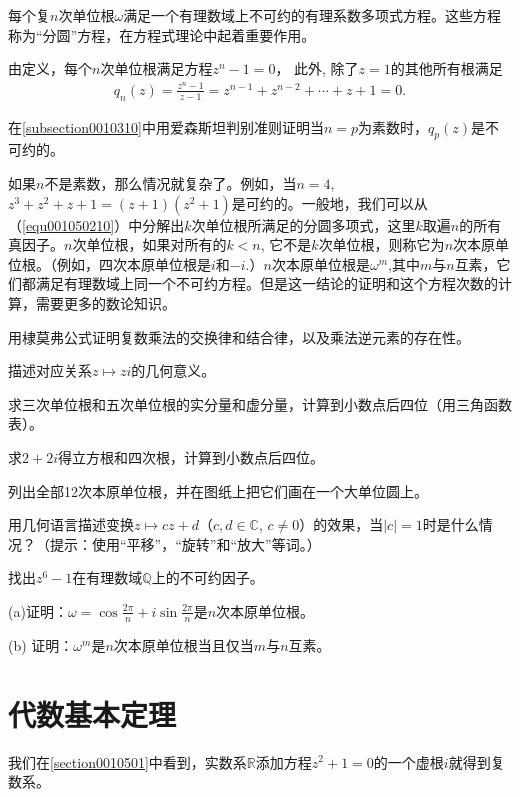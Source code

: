 每个复$n$次单位根$\omega$满足一个有理数域上不可约的有理系数多项式方程。这些方程称为“分圆”方程，在方程式理论中起着重要作用。

由定义，每个$n$次单位根满足方程$z^n-1=0$， 此外, 除了$z=1$的其他所有根满足
\begin{gather}\label{equ001050210}
q_n(z) = \frac{z^n-1}{z-1} = z^{n-1} + z^{n-2} + \cdots + z + 1 = 0.
\end{gather}

在\ref{subsection0010310}中用爱森斯坦判别准则证明当$n=p$为素数时，$q_p(z)$是不可约的。

如果$n$不是素数，那么情况就复杂了。例如，当$n=4$, $z^3+z^2+z+1=(z+1)(z^2+1)$是可约的。一般地，我们可以从（\ref{equ001050210}）中分解出$k$次单位根所满足的分圆多项式，这里$k$取遍$n$的所有真因子。$n$次单位根，如果对所有的$k<n$, 它不是$k$次单位根，则称它为$n$次本原单位根。（例如，四次本原单位根是$i$和$-i$.）$n$次本原单位根是$\omega^m$,其中$m$与$n$互素，它们都满足有理数域上同一个不可约方程。但是这一结论的证明和这个方程次数的计算，需要更多的数论知识。

\begin{problemset}
\item 用棣莫弗公式证明复数乘法的交换律和结合律，以及乘法逆元素的存在性。

\item 描述对应关系$z \mapsto zi$的几何意义。

\item 求三次单位根和五次单位根的实分量和虚分量，计算到小数点后四位（用三角函数表）。

\item 求$2+2i$得立方根和四次根，计算到小数点后四位。

\item 列出全部12次本原单位根，并在图纸上把它们画在一个大单位圆上。

\item 用几何语言描述变换$z \mapsto cz+d$（$c, d \in \mathbb{C}$, $c \neq 0$）的效果，当$|c|=1$时是什么情况？（提示：使用“平移”，“旋转”和“放大”等词。）

\item 找出$z^6-1$在有理数域$\mathbb{Q}$上的不可约因子。

\item (a)证明：$\omega = \cos{\frac{2\pi}{n}} + i\sin{\frac{2\pi}{n}}$是$n$次本原单位根。

(b) 证明：$\omega^m$是$n$次本原单位根当且仅当$m$与$n$互素。
\end{problemset}



\section{代数基本定理}\label{section0010503}
我们在\ref{section0010501}中看到，实数系$\mathbb{R}$添加方程$z^2+1=0$的一个虚根$i$就得到复数系。
















